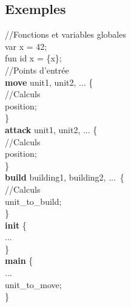 \documentclass[french,xcolor={usenames,dvipsnames}]{beamer}
\begin{document}
\subsection{Exemples}
\begin{frame}
  \fontsize{6pt}{7.2}\selectfont

  //Fonctions et variables globales\\
  var x = 42;\\
  fun id x = \{x\};\\
  \vspace{10pt}
  //Points d'entrée\\
  \textbf{move} unit1, unit2, ... \{\\
    \hspace{15pt}//Calculs\\
    \hspace{15pt}position;\\
  \}\\
  \vspace{10pt}
  \textbf{attack} unit1, unit2, ... \{\\
    \hspace{15pt}//Calculs\\
    \hspace{15pt}position;\\
  \}\\
  \vspace{10pt}
  \textbf{build} building1, building2, ... \{\\
    \hspace{15pt}//Calculs\\
    \hspace{15pt}unit\_to\_build;\\
  \}\\
  \vspace{10pt}
  \textbf{init} \{\\
    \hspace{15pt}...\\
  \}\\
  \vspace{10pt}
  \textbf{main} \{\\
    \hspace{15pt}...\\
    \hspace{15pt}unit\_to\_move;\\
  \}\\
\end{frame}
\end{document}
